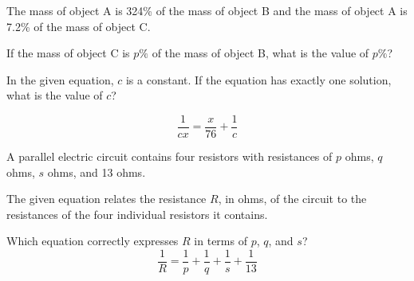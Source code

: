 \vspace{0.75em}


\vspace{2em}
\newpage

\noindent\markforreview
\vspace{1em}

The mass of object A is 324\% of the mass of object B and the mass of object A is 7.2\% of the mass of object C.

If the mass of object C is \(p\%\) of the mass of object B, what is the value of \(p\%\)?

\vspace{0.75em}


\vspace{2em}
\newpage

\noindent\markforreview
\vspace{1em}

In the given equation, \(c\) is a constant. If the equation has exactly one solution, what is the value of \(c\)?

\[
\frac{1}{cx} = \frac{x}{76} + \frac{1}{c}
\]

\vspace{2em}
\newpage

\noindent\markforreview
\vspace{1em}

A parallel electric circuit contains four resistors with resistances of \(p\) ohms, \(q\) ohms, \(s\) ohms, and 13 ohms.

The given equation relates the resistance \(R\), in ohms, of the circuit to the resistances of the four individual resistors it contains.

Which equation correctly expresses \(R\) in terms of \(p\), \(q\), and \(s\)?
\[
\frac{1}{R} = \frac{1}{p} + \frac{1}{q} + \frac{1}{s} + \frac{1}{13}
\]

\vspace{0.75em}


\vspace{2em}
\newpage

